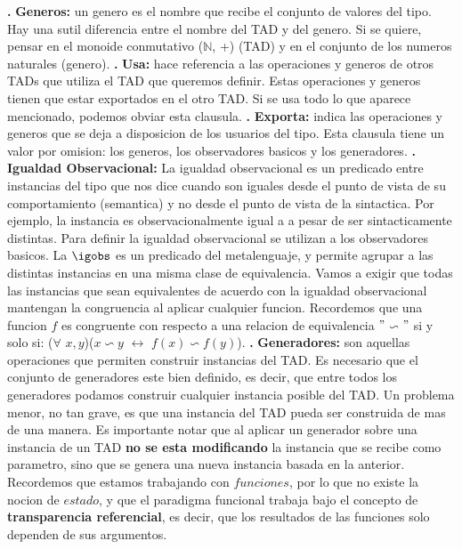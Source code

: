 \documentclass[10pt,a4paper]{article}
\begin{document}
\newline
\newline
\textbf{.} \textbf{Generos:} un genero es el nombre que recibe el conjunto de valores del tipo. Hay una sutil diferencia entre el nombre del TAD y del genero. Si se quiere, pensar en el monoide conmutativo ($\mathbb{N}$, +) (TAD) y en el conjunto de los numeros naturales (genero). 
\newline
\newline
\textbf{.} \textbf{Usa:} hace referencia a las operaciones y generos de otros TADs que utiliza el TAD que queremos definir. Estas operaciones y generos tienen que estar exportados en el otro TAD. Si se usa todo lo que aparece mencionado, podemos obviar esta clausula.
\newline
\newline
\textbf{.} \textbf{Exporta:} indica las operaciones y generos que se deja a disposicion de los usuarios del tipo. Esta clausula tiene un valor por omision: los generos, los observadores basicos y los generadores. 
\newline
\newline
\textbf{.} \textbf{Igualdad Observacional:} La igualdad observacional es un predicado entre instancias del tipo que nos dice cuando son iguales desde el punto de vista de su comportamiento (semantica) y no desde el punto de vista de la sintactica. Por ejemplo, la instancia  es observacionalmente igual a  a pesar de ser sintacticamente distintas. Para definir la igualdad observacional se utilizan a los observadores basicos. La $\igobs$ es un predicado del metalenguaje, y permite agrupar a las distintas instancias en una misma clase de equivalencia. Vamos a exigir que todas las instancias que sean equivalentes de acuerdo con la igualdad observacional mantengan la congruencia al aplicar cualquier funcion. Recordemos que una funcion $f$ es congruente con respecto a una relacion de equivalencia $"$$\backsim$$"$ si y solo si: ($\forall$ $x,y$)($x \backsim y$ $\leftrightarrow$ $f(x) \backsim f(y)$). 
\newline
\newline
\textbf{.} \textbf{Generadores:} son aquellas operaciones que permiten construir instancias del TAD. Es necesario que el conjunto de generadores este bien definido, es decir, que entre todos los generadores podamos construir cualquier instancia posible del TAD. Un problema menor, no tan grave, es que una instancia del TAD pueda ser construida de mas de una manera. Es importante notar que al aplicar un generador sobre una instancia de un TAD \textbf{no se esta modificando} la instancia que se recibe como parametro, sino que se genera una nueva instancia basada en la anterior. Recordemos que estamos trabajando con $funciones$, por lo que no existe la nocion de $estado$, y que el paradigma funcional trabaja bajo el concepto de \textbf{transparencia referencial}, es decir, que los resultados de las funciones solo dependen de sus argumentos. 
\end{document}
